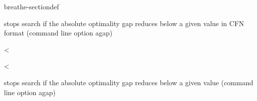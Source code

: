 \documentclass[letterpaper,10pt,openany,oneside,english]{sphinxmanual}
\begin{document}
\begin{fulllineitems}
\begin{sphinxuseclass}{breathe-sectiondef}
\begin{fulllineitems}
\sphinxAtStartPar
stops search if the absolute optimality gap reduces below a given value in CFN format (command line option \sphinxhyphen{}agap) 

\end{fulllineitems}


\begin{fulllineitems}
\label{\detokenize{ref/ref_cpp:_CPPv4N8ToulBar215deltaUbAbsoluteE}}\label{\detokenize{ref/ref_cpp:_CPPv3N8ToulBar215deltaUbAbsoluteE}}\label{\detokenize{ref/ref_cpp:_CPPv2N8ToulBar215deltaUbAbsoluteE}}\label{\detokenize{ref/ref_cpp:ToulBar2::deltaUbAbsolute__Cost}}
\pysigstartsignatures
\pysigstartmultiline
{}
\pysigstopmultiline
\pysigstopsignatures
\sphinxAtStartPar
\textless{} 

\end{fulllineitems}


\begin{fulllineitems}
\label{\detokenize{ref/ref_cpp:_CPPv4N8ToulBar218deltaUbRelativeGapE}}\label{\detokenize{ref/ref_cpp:_CPPv3N8ToulBar218deltaUbRelativeGapE}}\label{\detokenize{ref/ref_cpp:_CPPv2N8ToulBar218deltaUbRelativeGapE}}\label{\detokenize{ref/ref_cpp:ToulBar2::deltaUbRelativeGap__Double}}
\pysigstartsignatures
\pysigstartmultiline
{}
\pysigstopmultiline
\pysigstopsignatures
\sphinxAtStartPar
\textless{} 

\sphinxAtStartPar
stops search if the absolute optimality gap reduces below a given value (command line option \sphinxhyphen{}agap) 

\end{fulllineitems}



\end{sphinxuseclass}
\end{fulllineitems}
\end{document}
